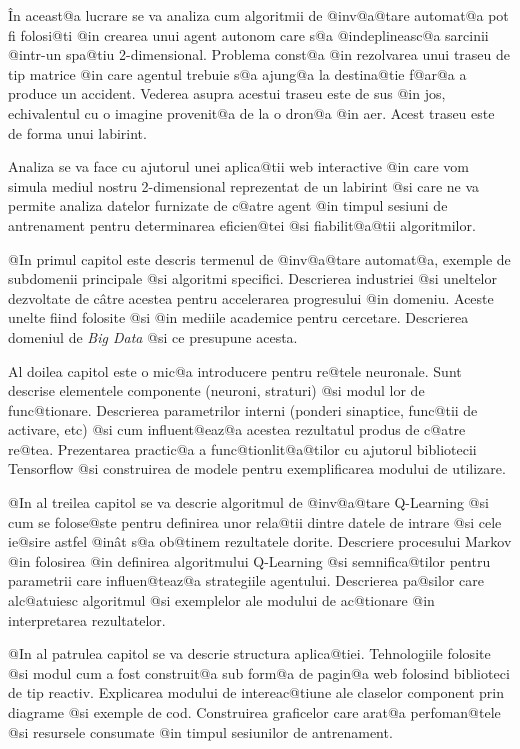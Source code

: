 \^ In aceast@a lucrare se va analiza cum algoritmii de @inv@a@tare automat@a  pot fi folosi@ti @in crearea unui agent autonom care s@a @indeplineasc@a sarcinii @intr-un spa@tiu 2-dimensional. Problema const@a @in rezolvarea unui traseu de tip matrice @in care agentul trebuie s@a ajung@a la destina@tie f@ar@a a produce un accident. Vederea asupra acestui traseu este de sus @in jos, echivalentul cu o imagine provenit@a de la o dron@a @in aer. Acest traseu este de forma unui labirint.  

Analiza se va face cu ajutorul unei aplica@tii web interactive @in care vom simula mediul nostru 2-dimensional reprezentat de un labirint @si care ne va permite analiza datelor furnizate de c@atre agent @in timpul sesiuni de antrenament pentru determinarea eficien@tei @si fiabilit@a@tii algoritmilor.


\hspace{0.2cm}

@In primul capitol este descris termenul de @inv@a@tare automat@a, exemple de subdomenii principale @si algoritmi specifici. Descrierea industriei @si uneltelor dezvoltate de c\^ atre acestea pentru accelerarea progresului @in domeniu. Aceste unelte fiind folosite @si @in mediile academice pentru cercetare. Descrierea domeniul de \textsl{Big Data} @si ce presupune acesta.

Al doilea capitol este o mic@a introducere pentru re@tele neuronale. Sunt descrise elementele componente (neuroni, straturi) @si modul lor de func@tionare. Descrierea parametrilor interni (ponderi sinaptice, func@tii de activare, etc) @si cum influent@eaz@a acestea rezultatul produs de c@atre re@tea. Prezentarea practic@a a func@tionlit@a@tilor cu ajutorul bibliotecii Tensorflow @si construirea de modele pentru exemplificarea modului de utilizare.

@In al treilea capitol se va descrie algoritmul de @inv@a@tare Q-Learning @si cum se folose@ste pentru definirea unor rela@tii dintre datele de intrare @si cele ie@sire astfel @in\^ at s@a ob@tinem rezultatele dorite. Descriere procesului Markov @in folosirea @in definirea algoritmului Q-Learning @si semnifica@tilor pentru parametrii care influen@teaz@a strategiile agentului. Descrierea pa@silor care alc@atuiesc algoritmul @si exemplelor ale modului de ac@tionare @in interpretarea rezultatelor.

@In al patrulea capitol se va descrie structura aplica@tiei. Tehnologiile folosite @si modul cum a fost construit@a sub form@a de pagin@a web folosind biblioteci de tip reactiv. Explicarea modului de intereac@tiune ale claselor component prin diagrame @si exemple de cod. Construirea graficelor care arat@a perfoman@tele @si resursele consumate @in timpul sesiunilor de antrenament. 

